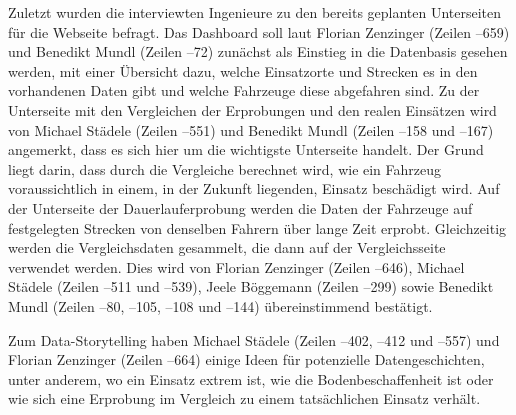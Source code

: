 Zuletzt wurden die interviewten Ingenieure zu den bereits geplanten Unterseiten für die Webseite befragt. Das Dashboard soll laut Florian Zenzinger (Zeilen --659) und Benedikt Mundl (Zeilen --72) zunächst als Einstieg in die Datenbasis gesehen werden, mit einer Übersicht dazu, welche Einsatzorte und Strecken es in den vorhandenen Daten gibt und welche Fahrzeuge diese abgefahren sind. Zu der Unterseite mit den Vergleichen der Erprobungen und den realen Einsätzen wird von Michael Städele (Zeilen --551) und Benedikt Mundl (Zeilen --158 und --167) angemerkt, dass es sich hier um die wichtigste Unterseite handelt. Der Grund liegt darin, dass durch die Vergleiche berechnet wird, wie ein Fahrzeug voraussichtlich in einem, in der Zukunft liegenden, Einsatz beschädigt wird. Auf der Unterseite der Dauerlauferprobung werden die Daten der Fahrzeuge auf festgelegten Strecken von denselben Fahrern über lange Zeit erprobt. Gleichzeitig werden die Vergleichsdaten gesammelt, die dann auf der Vergleichsseite verwendet werden. Dies wird von Florian Zenzinger (Zeilen --646), Michael Städele (Zeilen --511 und --539), Jeele Böggemann (Zeilen --299) sowie Benedikt Mundl (Zeilen --80, --105, --108 und --144) übereinstimmend bestätigt.

Zum Data-Storytelling haben Michael Städele (Zeilen --402, --412 und --557) und Florian Zenzinger (Zeilen --664) einige Ideen für potenzielle Datengeschichten, unter anderem, wo ein Einsatz extrem ist, wie die Bodenbeschaffenheit ist oder wie sich eine Erprobung im Vergleich zu einem tatsächlichen Einsatz verhält.

